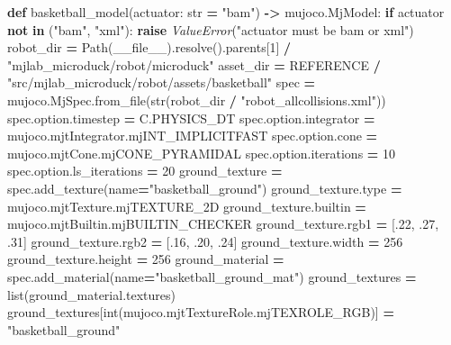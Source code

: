 \documentclass[
  chinese,
  11pt,
  letterpaper,
]{article}
\newenvironment{Shaded}{\begin{snugshade}}{\end{snugshade}}
\newcommand{\BuiltInTok}[1]{#1}
\newcommand{\ControlFlowTok}[1]{\textcolor[rgb]{0.13,0.29,0.53}{\textbf{#1}}}
\newcommand{\DecValTok}[1]{\textcolor[rgb]{0.00,0.00,0.81}{#1}}
\newcommand{\FloatTok}[1]{\textcolor[rgb]{0.00,0.00,0.81}{#1}}
\newcommand{\KeywordTok}[1]{\textcolor[rgb]{0.13,0.29,0.53}{\textbf{#1}}}
\newcommand{\NormalTok}[1]{#1}
\newcommand{\OperatorTok}[1]{\textcolor[rgb]{0.81,0.36,0.00}{\textbf{#1}}}
\newcommand{\PreprocessorTok}[1]{\textcolor[rgb]{0.56,0.35,0.01}{\textit{#1}}}
\newcommand{\StringTok}[1]{\textcolor[rgb]{0.31,0.60,0.02}{#1}}
\newcommand{\VariableTok}[1]{\textcolor[rgb]{0.00,0.00,0.00}{#1}}
\renewenvironment{Shaded}{\par\smallskip}{\par\smallskip}
\begin{document}
\begin{Shaded}
\begin{Highlighting}[]
\KeywordTok{def}\NormalTok{ basketball\_model(actuator: }\BuiltInTok{str} \OperatorTok{=} \StringTok{"bam"}\NormalTok{) }\OperatorTok{{-}\textgreater{}}\NormalTok{ mujoco.MjModel:}
    \ControlFlowTok{if}\NormalTok{ actuator }\KeywordTok{not} \KeywordTok{in}\NormalTok{ (}\StringTok{"bam"}\NormalTok{, }\StringTok{"xml"}\NormalTok{):}
        \ControlFlowTok{raise} \PreprocessorTok{ValueError}\NormalTok{(}\StringTok{"actuator must be bam or xml"}\NormalTok{)}
\NormalTok{    robot\_dir }\OperatorTok{=}\NormalTok{ Path(}\VariableTok{\_\_file\_\_}\NormalTok{).resolve().parents[}\DecValTok{1}\NormalTok{] }\OperatorTok{/} \StringTok{"mjlab\_microduck/robot/microduck"}
\NormalTok{    asset\_dir }\OperatorTok{=}\NormalTok{ REFERENCE }\OperatorTok{/} \StringTok{"src/mjlab\_microduck/robot/assets/basketball"}
\NormalTok{    spec }\OperatorTok{=}\NormalTok{ mujoco.MjSpec.from\_file(}\BuiltInTok{str}\NormalTok{(robot\_dir }\OperatorTok{/} \StringTok{"robot\_allcollisions.xml"}\NormalTok{))}
\NormalTok{    spec.option.timestep }\OperatorTok{=}\NormalTok{ C.PHYSICS\_DT}
\NormalTok{    spec.option.integrator }\OperatorTok{=}\NormalTok{ mujoco.mjtIntegrator.mjINT\_IMPLICITFAST}
\NormalTok{    spec.option.cone }\OperatorTok{=}\NormalTok{ mujoco.mjtCone.mjCONE\_PYRAMIDAL}
\NormalTok{    spec.option.iterations }\OperatorTok{=} \DecValTok{10}
\NormalTok{    spec.option.ls\_iterations }\OperatorTok{=} \DecValTok{20}
\NormalTok{    ground\_texture }\OperatorTok{=}\NormalTok{ spec.add\_texture(name}\OperatorTok{=}\StringTok{"basketball\_ground"}\NormalTok{)}
\NormalTok{    ground\_texture.}\BuiltInTok{type} \OperatorTok{=}\NormalTok{ mujoco.mjtTexture.mjTEXTURE\_2D}
\NormalTok{    ground\_texture.builtin }\OperatorTok{=}\NormalTok{ mujoco.mjtBuiltin.mjBUILTIN\_CHECKER}
\NormalTok{    ground\_texture.rgb1 }\OperatorTok{=}\NormalTok{ [}\FloatTok{.22}\NormalTok{, }\FloatTok{.27}\NormalTok{, }\FloatTok{.31}\NormalTok{]}
\NormalTok{    ground\_texture.rgb2 }\OperatorTok{=}\NormalTok{ [}\FloatTok{.16}\NormalTok{, }\FloatTok{.20}\NormalTok{, }\FloatTok{.24}\NormalTok{]}
\NormalTok{    ground\_texture.width }\OperatorTok{=} \DecValTok{256}
\NormalTok{    ground\_texture.height }\OperatorTok{=} \DecValTok{256}
\NormalTok{    ground\_material }\OperatorTok{=}\NormalTok{ spec.add\_material(name}\OperatorTok{=}\StringTok{"basketball\_ground\_mat"}\NormalTok{)}
\NormalTok{    ground\_textures }\OperatorTok{=} \BuiltInTok{list}\NormalTok{(ground\_material.textures)}
\NormalTok{    ground\_textures[}\BuiltInTok{int}\NormalTok{(mujoco.mjtTextureRole.mjTEXROLE\_RGB)] }\OperatorTok{=} \StringTok{"basketball\_ground"}

\end{Highlighting}
\end{Shaded}
\end{document}
